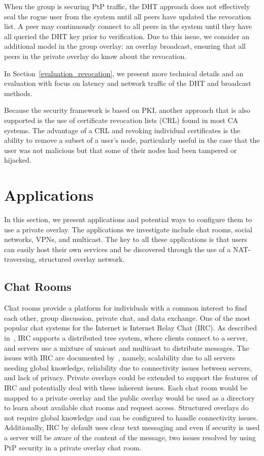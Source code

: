 \documentclass[conference]{IEEEtran}
\begin{document}
When the group is securing PtP traffic, the DHT approach does not effectively
seal the rogue user from the system until all peers have updated the revocation
list.  A peer may continuously connect to all peers in the system until they
have all queried the DHT key prior to verification.  Due to this issue, we 
consider an additional model in the group overlay: an overlay broadcast, ensuring
that all peers in the private overlay do know about the revocation.  

In Section~\ref{evaluation_revocation}, we present more technical details and
an evaluation with focus on latency and network traffic of the DHT and broadcast
methods.

Because the security framework is based on PKI, another approach that is also
supported is the use of certificate revocation lists
(CRL) found in most CA systems.  The advantage of a CRL and revoking individual
certificates is the ability to remove a subset of a user's node, particularly
useful in the case that the user was not malicious but that some of their nodes
had been tampered or hijacked.

\section{Applications}
\label{applications}
In this section, we present applications and potential ways to configure them
to use a private overlay.  The applications we investigate include chat rooms,
social networks, VPNs, and multicast.  The key to all these applications is that
users can easily host their own services and be discovered through the use of
a NAT-traversing, structured overlay network.

\subsection{Chat Rooms}
Chat rooms provide a platform for individuals with a common interest to find
each other, group discussion, private chat, and data exchange.  One of the most
popular chat systems for the Internet is Internet Relay Chat (IRC).  As
described in~\cite{irc}, IRC supports a distributed tree system, where clients
connect to a server, and servers use a mixture of unicast and multicast to
distribute messages.  The issues with IRC are documented by~\cite{irc_arch},
namely, scalability due to all servers needing global knowledge, reliability due
to connectivity issues between servers, and lack of privacy.  Private overlays
could be extended to support the features of IRC and potentially deal with these
inherent issues.  Each chat room would be mapped to a private overlay and the
public overlay would be used as a directory to learn about available chat rooms
and request access.  Structured overlays do not require global knowledge and can
be configured to handle connectivity issues.  Additionally, IRC by default uses
clear text messaging and even if security is used a server will be aware of the
content of the message, two issues resolved by using PtP security in a private
overlay chat room.  
\end{document}
